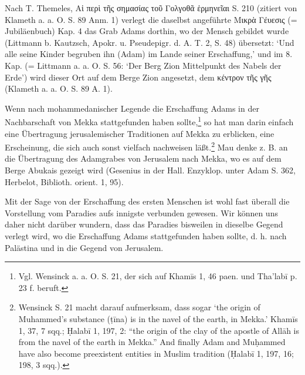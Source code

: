 \documentclass[a4paper, 11pt, oneside]{article}
\begin{document}
Nach T. Themeles, Αἱ περὶ τῆς σημασίας τοῦ Γολγοθᾶ ἑρμηνεῖαι S. 210 (zitiert von Klameth a. a. O. S. 89 Anm. 1) verlegt die daselbst angeführte Μικρὰ Γέυεσις (= Jubiläenbuch) Kap. 4 das Grab Adams dorthin, wo der Mensch gebildet wurde (Littmann b. Kautzsch, Apokr. u. Pseudepigr. d. A. T. 2, S. 48) übersetzt: `Und alle seine Kinder begruben ihn (Adam) im Lande seiner Erschaffung,' und im 8. Kap. (= Littmann a. a. O. S. 56: `Der Berg Zion Mittelpunkt des Nabels der Erde') wird dieser Ort auf dem Berge Zion angesetzt, dem κέντρον τῆς γῆς (Klameth a. a. O. S. 89 A. 1).

Wenn nach mohammedanischer Legende die Erschaffung Adams in der Nachbarschaft von Mekka stattgefunden haben sollte,\footnote{Vgl. Wensinck a. a. O. S. 21, der sich auf Khamīs 1, 46 paen. und Tha'labī p. 23 f. beruft.} so hat man darin einfach eine Übertragung jerusalemischer Traditionen auf Mekka zu erblicken, eine Erscheinung, die sich auch sonst vielfach nachweisen läßt.\footnote{Wensinck S. 21 macht darauf aufmerksam, dass sogar `the origin of Muhammed's substance (ṭīna) is in the navel of the earth, in Mekka.' Khamīs 1, 37, 7 sqq.; \d{H}alabī 1, 197, 2: "`the origin of the clay of the apostle of Allāh is from the navel of the earth in Mekka."' And finally Adam and Mu\d{h}ammed have also become preexistent entities in Muslim tradition (\d{H}alabī 1, 197, 16; 198, 3 sqq.).} Mau denke z. B. an die Übertragung des Adamgrabes von Jerusalem nach Mekka, wo es auf dem Berge Abukais gezeigt wird (Gesenius in der Hall. Enzyklop. unter Adam S. 362, Herbelot, Biblioth. orient. 1, 95).

Mit der Sage von der Erschaffung des ersten Menschen ist wohl fast überall die Vorstellung vom Paradies aufs innigste verbunden gewesen. Wir können uns daher nicht darüber wundern, dass das Paradies bisweilen in dieselbe Gegend verlegt wird, wo die Erschaffung Adams stattgefunden haben sollte, d. h. nach Palästina und in die Gegend von Jerusalem.
\end{document}
